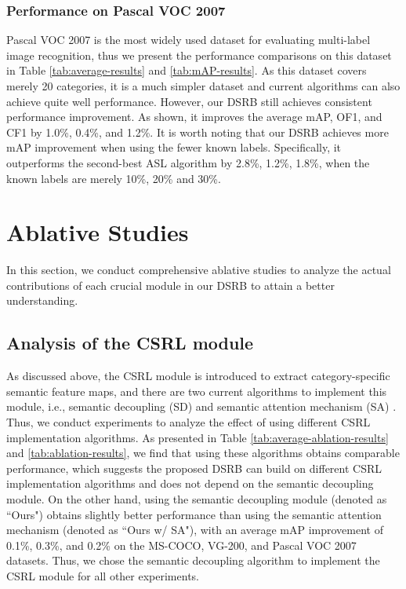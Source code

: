 \documentclass[lettersize,journal]{IEEEtran}
\begin{document}
\subsubsection{Performance on Pascal VOC 2007}
Pascal VOC 2007 is the most widely used dataset for evaluating multi-label image recognition, thus we present the performance comparisons on this dataset in Table \ref{tab:average-results} and \ref{tab:mAP-results}. As this dataset covers merely 20 categories, it is a much simpler dataset and current algorithms can also achieve quite well performance. However, our DSRB still achieves consistent performance improvement. As shown, it improves the average mAP, OF1, and CF1 by 1.0\%, 0.4\%, and 1.2\%. It is worth noting that our DSRB achieves more mAP improvement when using the fewer known labels. Specifically, it outperforms the second-best ASL algorithm by 2.8\%, 1.2\%, 1.8\%, when the known labels are merely 10\%, 20\% and 30\%.

\section{Ablative Studies} \label{sec:ablative}
In this section, we conduct comprehensive ablative studies to analyze the actual contributions of each crucial module in our DSRB to attain a better understanding. 

\subsection{Analysis of the CSRL module}
As discussed above, the CSRL module is introduced to extract category-specific semantic feature maps, and there are two current algorithms to implement this module, i.e., semantic decoupling (SD) \cite{Chen2019SSGRL} and semantic attention mechanism (SA) \cite{Ye2020ADD-GCN}. Thus, we conduct experiments to analyze the effect of using different CSRL implementation algorithms. As presented in Table \ref{tab:average-ablation-results} and \ref{tab:ablation-results}, we find that using these algorithms obtains comparable performance, which suggests the proposed DSRB can build on different CSRL implementation algorithms and does not depend on the semantic decoupling module. On the other hand, using the semantic decoupling module (denoted as ``Ours") obtains slightly better performance than using the semantic attention mechanism (denoted as ``Ours w/ SA"), with an average mAP improvement of 0.1\%, 0.3\%, and 0.2\% on the MS-COCO, VG-200, and Pascal VOC 2007 datasets. Thus, we chose the semantic decoupling algorithm to implement the CSRL module for all other experiments.
\end{document}
